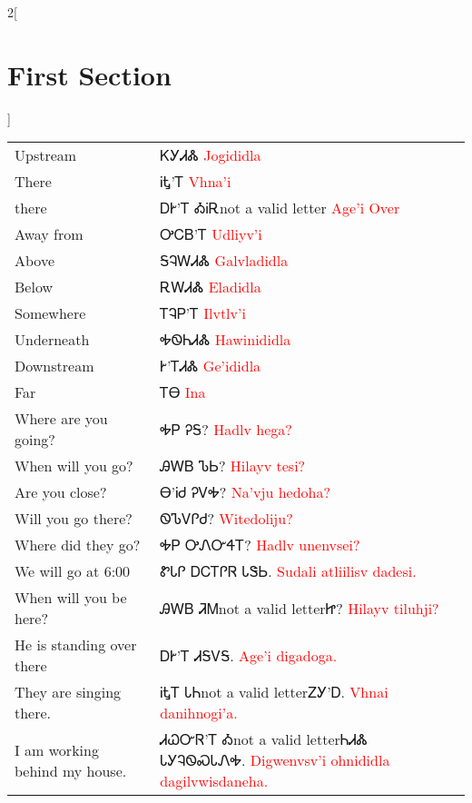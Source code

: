 \begin{multicols}{2}[\section{First Section}]
\begin{minipage}{\linewidth}
\begin{tabular}{p{3cm} p{11cm}}
Upstream & ᏦᎩᏗᏜ 
 \newline \textcolor{red}{Jogididla}\\
There & ᎥᎿ’Ꭲ 
 \newline \textcolor{red}{Vhna’i}\\
there & ᎠᎨ’Ꭲ ᎣᎥᎡnot a valid letter 
 \newline \textcolor{red}{Age’i Over}\\
Away from & ᎤᏟᏴ’Ꭲ 
 \newline \textcolor{red}{Udliyv’i}\\
Above & ᎦᎸᎳᏗᏜ 
 \newline \textcolor{red}{Galvladidla}\\
Below & ᎡᎳᏗᏜ 
 \newline \textcolor{red}{Eladidla}\\
Somewhere & ᎢᎸᏢ’Ꭲ 
 \newline \textcolor{red}{Ilvtlv’i}\\
Underneath & ᎭᏫᏂᏗᏜ 
 \newline \textcolor{red}{Hawinididla}\\
Downstream & Ꭸ’ᎢᏗᏜ 
 \newline \textcolor{red}{Ge’ididla}\\
Far & ᎢᎾ 
 \newline \textcolor{red}{Ina}\\
Where are you going? & ᎭᏢ ᎮᎦ? 
 \newline \textcolor{red}{Hadlv hega?}\\
When will you go? & ᎯᎳᏴ ᏖᏏ? 
 \newline \textcolor{red}{Hilayv tesi?}\\
Are you close? & Ꮎ’ᎥᏧ ᎮᏙᎭ? 
 \newline \textcolor{red}{Na’vju hedoha?}\\
Will you go there? & ᏫᏖᏙᎵᏧ? 
 \newline \textcolor{red}{Witedoliju?}\\
Where did they go? & ᎭᏢ ᎤᏁᏅᏎᎢ? 
 \newline \textcolor{red}{Hadlv unenvsei?}\\
We will go at 6:00 & ᏑᏓᎵ ᎠᏟᎢᎵᏒ ᏓᏕᏏ. 
 \newline \textcolor{red}{Sudali atliilisv dadesi.}\\
When will you be here? & ᎯᎳᏴ ᏘᎷnot a valid letterᏥ? 
 \newline \textcolor{red}{Hilayv tiluhji?}\\
He is standing over there & ᎠᎨ’Ꭲ ᏗᎦᏙᎦ. 
 \newline \textcolor{red}{Age’i digadoga.}\\
They are singing there. & ᎥᎿᎢ ᏓᏂnot a valid letterᏃᎩ’Ꭰ. 
 \newline \textcolor{red}{Vhnai danihnogi’a.}\\
I am working behind my house. & ᏗᏇᏅᏒ’Ꭲ Ꭳnot a valid letterᏂᏗᏜ ᏓᎩᎸᏫᏍᏓᏁᎭ. 
 \newline \textcolor{red}{Digwenvsv’i ohnididla dagilvwisdaneha.}\\


\end{tabular}
\end{minipage}
\end{multicols}
